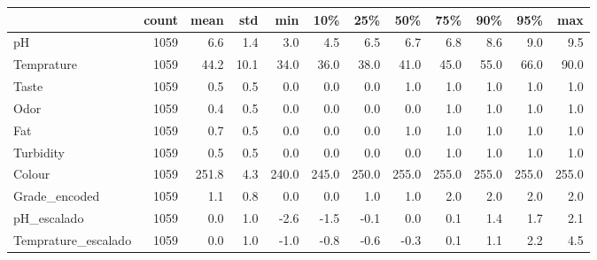 \begin{tabular}{lrrrrrrrrrrr}
\toprule
 & count & mean & std & min & 10\% & 25\% & 50\% & 75\% & 90\% & 95\% & max \\
\midrule
pH & 1059 & 6.6 & 1.4 & 3.0 & 4.5 & 6.5 & 6.7 & 6.8 & 8.6 & 9.0 & 9.5 \\
Temprature & 1059 & 44.2 & 10.1 & 34.0 & 36.0 & 38.0 & 41.0 & 45.0 & 55.0 & 66.0 & 90.0 \\
Taste & 1059 & 0.5 & 0.5 & 0.0 & 0.0 & 0.0 & 1.0 & 1.0 & 1.0 & 1.0 & 1.0 \\
Odor & 1059 & 0.4 & 0.5 & 0.0 & 0.0 & 0.0 & 0.0 & 1.0 & 1.0 & 1.0 & 1.0 \\
Fat  & 1059 & 0.7 & 0.5 & 0.0 & 0.0 & 0.0 & 1.0 & 1.0 & 1.0 & 1.0 & 1.0 \\
Turbidity & 1059 & 0.5 & 0.5 & 0.0 & 0.0 & 0.0 & 0.0 & 1.0 & 1.0 & 1.0 & 1.0 \\
Colour & 1059 & 251.8 & 4.3 & 240.0 & 245.0 & 250.0 & 255.0 & 255.0 & 255.0 & 255.0 & 255.0 \\
Grade\_encoded & 1059 & 1.1 & 0.8 & 0.0 & 0.0 & 1.0 & 1.0 & 2.0 & 2.0 & 2.0 & 2.0 \\
pH\_escalado & 1059 & 0.0 & 1.0 & -2.6 & -1.5 & -0.1 & 0.0 & 0.1 & 1.4 & 1.7 & 2.1 \\
Temprature\_escalado & 1059 & 0.0 & 1.0 & -1.0 & -0.8 & -0.6 & -0.3 & 0.1 & 1.1 & 2.2 & 4.5 \\
\bottomrule
\end{tabular}